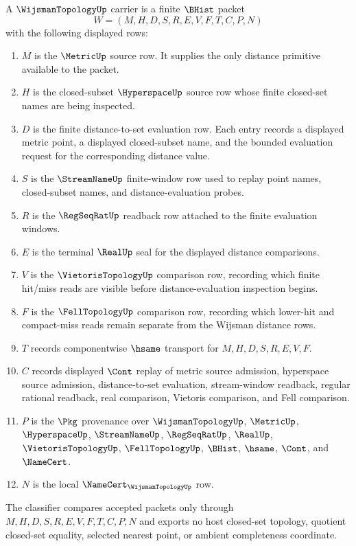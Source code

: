 \begin{definition}
\label{def:wijsman-topology-carrier}
A $\WijsmanTopologyUp$ carrier is a finite $\BHist$ packet
$$
W=(M,H,D,S,R,E,V,F,T,C,P,N)
$$
with the following displayed rows:
\begin{enumerate}
\item $M$ is the $\MetricUp$ source row. It supplies the only distance primitive available to the packet.
\item $H$ is the closed-subset $\HyperspaceUp$ source row whose finite closed-set names are being inspected.
\item $D$ is the finite distance-to-set evaluation row. Each entry records a displayed metric point, a displayed closed-subset name, and the bounded evaluation request for the corresponding distance value.
\item $S$ is the $\StreamNameUp$ finite-window row used to replay point names, closed-subset names, and distance-evaluation probes.
\item $R$ is the $\RegSeqRatUp$ readback row attached to the finite evaluation windows.
\item $E$ is the terminal $\RealUp$ seal for the displayed distance comparisons.
\item $V$ is the $\VietorisTopologyUp$ comparison row, recording which finite hit/miss reads are visible before distance-evaluation inspection begins.
\item $F$ is the $\FellTopologyUp$ comparison row, recording which lower-hit and compact-miss reads remain separate from the Wijsman distance rows.
\item $T$ records componentwise $\hsame$ transport for $M,H,D,S,R,E,V,F$.
\item $C$ records displayed $\Cont$ replay of metric source admission, hyperspace source admission, distance-to-set evaluation, stream-window readback, regular rational readback, real comparison, Vietoris comparison, and Fell comparison.
\item $P$ is the $\Pkg$ provenance over $\WijsmanTopologyUp$, $\MetricUp$, $\HyperspaceUp$, $\StreamNameUp$, $\RegSeqRatUp$, $\RealUp$, $\VietorisTopologyUp$, $\FellTopologyUp$, $\BHist$, $\hsame$, $\Cont$, and $\NameCert$.
\item $N$ is the local $\NameCert_{\WijsmanTopologyUp}$ row.
\end{enumerate}
The classifier compares accepted packets only through $M,H,D,S,R,E,V,F,T,C,P,N$ and exports no host closed-set topology, quotient closed-set equality, selected nearest point, or ambient completeness coordinate.
\end{definition}

